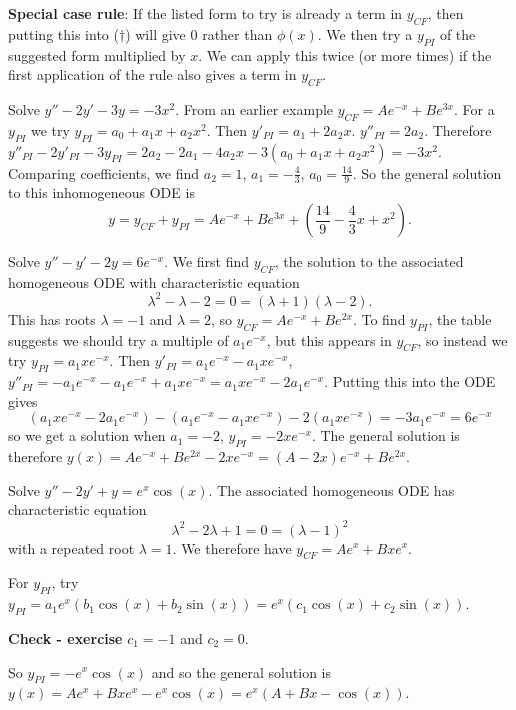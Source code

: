 \documentclass[10pt, a4paper]{article}
\begin{document}
\textbf{Special case rule}:
If the listed form to try is already a term in $y_{CF}$,
then putting this into ($\dagger$) will give $0$ rather than $\phi(x)$.
We then try a $y_{PI}$ of the suggested form multiplied by $x$.
We can apply this twice
(or more times)
if the first application of the rule also gives a term in $y_{CF}$.
\begin{example}
    Solve $y'' - 2y' - 3y = -3x ^ 2$.
    From an earlier example $y_{CF} = Ae ^ {-x} + Be ^ {3x}$.
    For a $y_{PI}$ we try $y_{PI} = a_0 + a_1x + a_2x ^ 2$.
    Then $y'_{PI} = a_1 + 2a_2x$.
    $y''_{PI} = 2a_2$.
    Therefore $y''_{PI} - 2y'_{PI} - 3y_{PI} = 2a_2 - 2a_1 - 4a_2x - 3(a_0 + a_1x + a_2x ^ 2) = -3x ^ 2$.
    Comparing coefficients,
    we find $a_2 = 1$, $a_1 = -\frac{4}{3}$, $a_0 = \frac{14}{9}$.
    So the general solution to this inhomogeneous ODE is
    \[
    y = y_{CF} + y_{PI} = Ae ^ {-x} + Be ^ {3x} + \left(\frac{14}{9} - \frac{4}{3}x + x ^ 2\right).
    \]
\end{example}

\begin{example}
    Solve $y'' - y' - 2y = 6e ^ {-x}$.
    We first find $y_{CF}$,
    the solution to the associated homogeneous ODE with characteristic equation
    \[
    \lambda ^ 2 - \lambda - 2 = 0 = (\lambda + 1)(\lambda - 2).
    \]
    This has roots $\lambda = -1$ and $\lambda = 2$,
    so $y_{CF} = Ae ^ {-x} + Be ^ {2x}$.
    To find $y_{PI}$,
    the table suggests we should try a multiple of $a_1e ^ {-x}$,
    but this appears in $y_{CF}$, so instead we try $y_{PI} = a_1xe ^ {-x}$.
    Then $y'_{PI} = a_1e ^ {-x} - a_1xe ^ {-x}$, $y''_{PI} = -a_1e ^ {-x} - a_1e ^ {-x} + a_1xe ^ {-x} = a_1xe ^ {-x} - 2a_1e ^ {-x}$.
    Putting this into the ODE gives
    \[
    (a_1xe ^ {-x} - 2a_1e ^ {-x}) - (a_1e ^ {-x} - a_1xe ^ {-x}) - 2(a_1xe ^ {-x}) = -3a_1e^{-x} = 6e ^ {-x}
    \]
    so we get a solution when $a_1 = -2$,
    $y_{PI} = -2xe ^ {-x}$.
    The general solution is therefore $y(x) = Ae ^ {-x} + Be ^ {2x} - 2xe ^ {-x} = (A - 2x)e ^ {-x} + Be ^ {2x}$.
\end{example}

\begin{example}
    Solve $y'' - 2y' + y = e ^ x\cos(x)$.
    The associated homogeneous ODE has characteristic equation
    \[
    \lambda ^ 2 - 2\lambda + 1 = 0 = (\lambda - 1) ^ 2
    \]
    with a repeated root $\lambda = 1$.
    We therefore have $y_{CF} = Ae ^ {x} + Bxe ^ {x}$.

    For $y_{PI}$,
    try $y_{PI} = a_1e ^ x(b_1\cos(x) + b_2\sin(x)) = e ^ x(c_1\cos(x) + c_2\sin(x))$.
    
    
    \textbf{Check - exercise} $c_1 = -1$ and $c_2 = 0$.

    So $y_{PI} = -e ^ x\cos(x)$ and so the general solution is $y(x) = Ae ^ {x} + Bxe ^ {x} - e ^ {x}\cos(x) = e ^ {x}(A + Bx - \cos(x))$.
\end{example}
\end{document}
